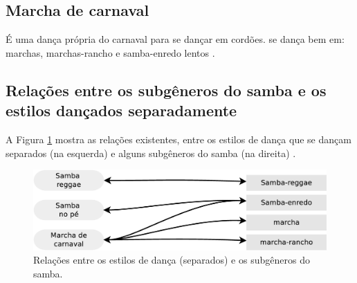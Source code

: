 \subsection{Marcha de carnaval}
 É uma dança própria do carnaval para se dançar em cordões.
se dança bem em: marchas, marchas-rancho e samba-enredo lentos  \cite[pp. 135]{perna2002samba}.


\subsection{Relações entre os subgêneros do samba e os estilos dançados separadamente}

A Figura \ref{fig:sambadavavsmusicaseparado} mostra as relações existentes, 
entre os estilos de dança que se dançam separados (na esquerda) 
e alguns subgêneros do samba (na direita)  \cite[pp. 134-138]{perna2002samba}.

\begin{figure}[h]
  \centering
    \includegraphics[width=1.0\textwidth]{chapters/cap-historia-dancasamba/dancavcmusicaseparado.eps}
  \caption{Relações entre os estilos de dança (separados) e os subgêneros do samba.}
\label{fig:sambadavavsmusicaseparado}
\end{figure}
